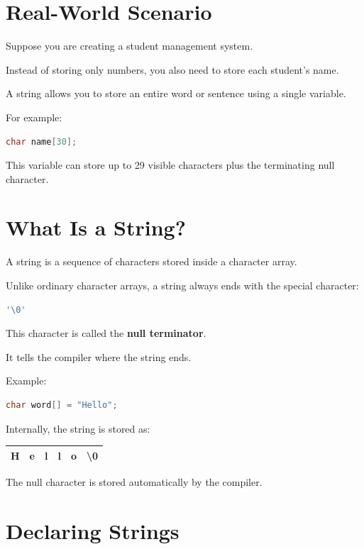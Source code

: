 \documentclass[12pt,openany]{book}
\begin{document}
\section{Real-World Scenario}

Suppose you are creating a student management system.

Instead of storing only numbers, you also need to store each student's name.

A string allows you to store an entire word or sentence using a single variable.

For example:

\begin{lstlisting}[language=C]
char name[30];
\end{lstlisting}

This variable can store up to 29 visible characters plus the terminating null character.

\section{What Is a String?}

A string is a sequence of characters stored inside a character array.

Unlike ordinary character arrays, a string always ends with the special character:

\begin{lstlisting}[language=C]
'\0'
\end{lstlisting}

This character is called the \textbf{null terminator}.

It tells the compiler where the string ends.

Example:

\begin{lstlisting}[language=C]
char word[] = "Hello";
\end{lstlisting}

Internally, the string is stored as:

\begin{center}
\begin{tabular}{|c|c|c|c|c|c|}
\hline
H & e & l & l & o & \textbackslash0 \\
\hline
\end{tabular}
\end{center}

The null character is stored automatically by the compiler.
\section{Declaring Strings}
\end{document}
